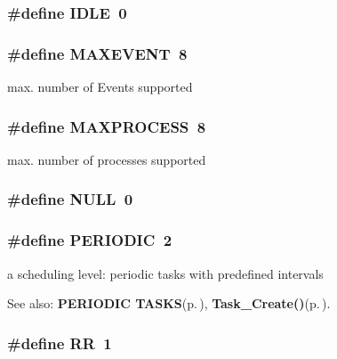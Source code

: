 \subsubsection{\setlength{\rightskip}{0pt plus 5cm}\#define IDLE~0}\label{os_8h_9c21a7caee326d7803b94ae1952b27ca}


\subsubsection{\setlength{\rightskip}{0pt plus 5cm}\#define MAXEVENT~8}\label{os_8h_2a50d99dc5d43eb57bdcb2c4c29bc76e}


max. number of Events supported 
\subsubsection{\setlength{\rightskip}{0pt plus 5cm}\#define MAXPROCESS~8}\label{os_8h_c31d2fa7fae458de0b2d85a573fdd578}


max. number of processes supported 
\subsubsection{\setlength{\rightskip}{0pt plus 5cm}\#define NULL~0}\label{os_8h_070d2ce7b6bb7e5c05602aa8c308d0c4}


\subsubsection{\setlength{\rightskip}{0pt plus 5cm}\#define PERIODIC~2}\label{os_8h_f36821ad7b93ab31dcfaaa25e134fdf0}


a scheduling level: periodic tasks with predefined intervals \begin{Desc}
\item[See also:]{\bf PERIODIC TASKS}{\rm (p.\,\pageref{index_periodic})}, {\bf Task\_\-Create()}{\rm (p.\,\pageref{os_8c_d26f7e7c3185a703e89e97547747b03e})}. \end{Desc}
\subsubsection{\setlength{\rightskip}{0pt plus 5cm}\#define RR~1}\label{os_8h_63979cf6054f403eab1d354e6dcc4ce9}


